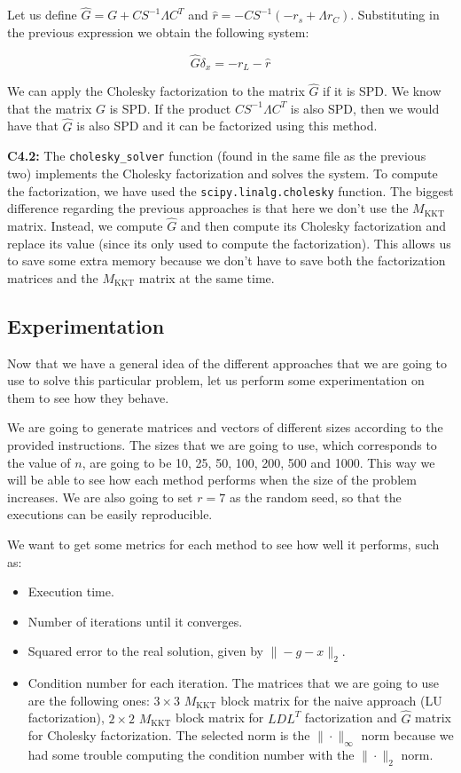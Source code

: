 \documentclass[11pt,a4paper]{article}
\begin{document}
Let us define $\hat{G} = G + CS^{-1}\Lambda C^T$ and $\hat{r} = -CS^{-1}(-r_s + \Lambda r_C)$.
Substituting in the previous expression we obtain the following system:

\[
  \hat{G} \delta_x = -r_L - \hat{r}
\]

We can apply the Cholesky factorization to the matrix $\hat{G}$ if it is SPD. We know that the matrix
$G$ is SPD. If the product $CS^{-1}\Lambda C^T$ is also SPD, then we would have that $\hat{G}$
is also SPD and it can be factorized using this method.

\noindent \textbf{C4.2:} The \texttt{cholesky\_solver} function (found in the same file
as the previous two) implements the Cholesky factorization and solves the system. To compute the
factorization, we have used the \texttt{scipy.linalg.cholesky} function. The biggest
difference regarding the previous approaches is that here we don't use the $M_{\text{KKT}}$ matrix.
Instead, we compute $\hat{G}$ and then compute its Cholesky factorization and replace its value
(since its only used to compute the factorization). This allows us to save some extra memory because
we don't have to save both the factorization matrices and the $M_{\text{KKT}}$ matrix at
the same time.

\subsection{Experimentation}

Now that we have a general idea of the different approaches that we are going to use to solve
this particular problem, let us perform some experimentation on them to see how they behave.

We are going to generate matrices and vectors of different sizes according to the provided instructions.
The sizes that we are going to use, which corresponds to the value of $n$, are going to be 10, 25, 50,
100, 200, 500 and 1000. This way we will be able to see how each method performs when the size of the
problem increases. We are also going to set $r = 7$ as the random seed, so that the executions can be
easily reproducible.

We want to get some metrics for each method to see how well it performs, such as:

\begin{itemize}
  \item Execution time.
  \item Number of iterations until it converges.
  \item Squared error to the real solution, given by $\| -g - x \|_2$.
  \item Condition number for each iteration. The matrices that we are going to use are the following
  ones: $3 \times 3$ $M_\text{KKT}$ block matrix for the naive approach (LU factorization),
  $2 \times 2$ $M_\text{KKT}$ block matrix for $LDL^T$ factorization and $\hat{G}$ matrix for Cholesky factorization.
  The selected norm is the $\| \cdot \|_\infty $ norm because we had some trouble computing the condition number
  with the $\| \cdot \|_2$ norm.
\end{itemize}
\end{document}
